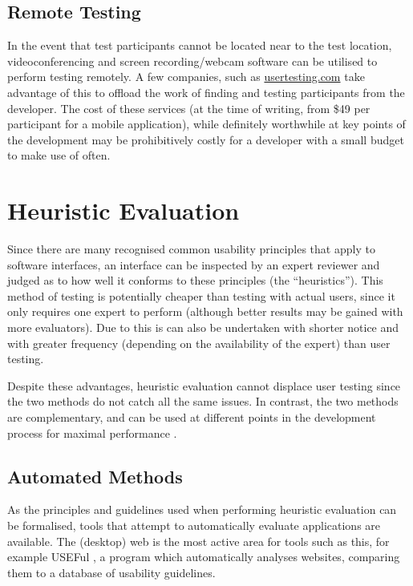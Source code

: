 \subsection{Remote Testing}

In the event that test participants cannot be located near to the test
location, videoconferencing and screen recording/webcam software can be
utilised to perform testing remotely. A few companies, such as
\url{usertesting.com} take advantage of this to offload the work of finding and
testing participants from the developer.  The cost of these services (at the
time of writing, from \$49 per participant for a mobile application), while
definitely worthwhile at key points of the development may be prohibitively
costly for a developer with a small budget to make use of often.

\section{Heuristic Evaluation}

Since there are many recognised common usability principles that apply to
software interfaces, an interface can be inspected by an expert reviewer and
judged as to how well it conforms to these principles (the ``heuristics'').
This method of testing is potentially cheaper than testing with actual users,
since it only requires one expert to perform (although better results may be
gained with more evaluators).  Due to this is can also be undertaken with
shorter notice and with greater frequency (depending on the availability of the
expert) than user testing.

Despite these advantages, heuristic evaluation cannot displace user testing
since the two methods do not catch all the same issues. In contrast, the two
methods are complementary, and can be used at different points in the
development process for maximal performance \cite{tan2009web, archer2010web}.

\subsection{Automated Methods}

As the principles and guidelines used when performing heuristic evaluation can
be formalised, tools that attempt to automatically evaluate applications are
available. The (desktop) web is the most active area for tools such as this,
for example USEFul \cite{dingli2011useful}, a program which automatically 
analyses websites, comparing them to a database of usability guidelines.

